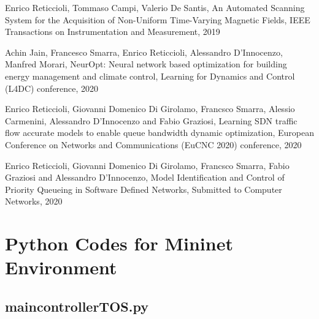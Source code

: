 \documentclass[12pt, a4paper, twoside, openright]{ociamthesis}  %
\begin{document}



\renewcommand{\bibname}{References}

\renewcommand{\bibname}{Publications}

\begin{thebibliography}{4}
 Enrico Reticcioli, Tommaso Campi, Valerio De Santis, An Automated Scanning System for the Acquisition of Non-Uniform Time-Varying Magnetic Fields, IEEE Transactions on Instrumentation and Measurement, 2019

Achin Jain, Francesco Smarra, Enrico Reticcioli, Alessandro D'Innocenzo, Manfred Morari, NeurOpt: Neural network based optimization for building energy management and climate control, Learning for Dynamics and Control (L4DC) conference, 2020

Enrico Reticcioli, Giovanni Domenico Di Girolamo, Francsco Smarra, Alessio Carmenini, Alessandro D’Innocenzo and Fabio Graziosi, Learning SDN traffic flow accurate models to enable queue bandwidth dynamic optimization, European Conference on Networks and Communications (EuCNC 2020) conference, 2020

Enrico Reticcioli, Giovanni Domenico Di Girolamo, Francsco Smarra, Fabio Graziosi and Alessandro D’Innocenzo, Model Identification and Control of Priority Queueing in Software Defined Networks, Submitted to Computer Networks, 2020
\end{thebibliography}
%

\appendix
\lstset{firstnumber=1}
\chapter{Python Codes for Mininet Environment}\label{Py_codes}
\section{main\textunderscore controller\textunderscore TOS.py}\label{main_controller_TOS}

\end{document}
